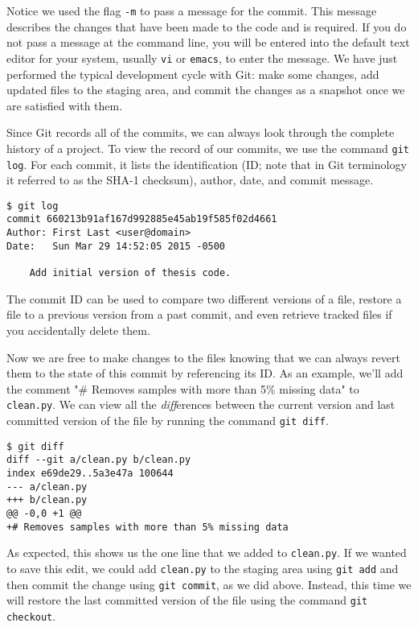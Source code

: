 Notice we used the flag \verb|-m| to pass a message for the commit.
This message describes the changes that have been made to the code and is required.
If you do not pass a message at the command line, you will be entered into the default text editor for your system, usually \verb|vi| or \verb|emacs|, to enter the message.
We have just performed the typical development cycle with Git:
make some changes, add updated files to the staging area, and commit the changes as a snapshot once we are satisfied with them.

Since Git records all of the commits, we can always look through the complete history of a project.
To view the record of our commits, we use the command \verb|git log|.
For each commit, it lists the identification (ID; note that in Git terminology it referred to as the SHA-1 checksum), author, date, and commit message.

\begin{lstlisting}
$ git log
commit 660213b91af167d992885e45ab19f585f02d4661
Author: First Last <user@domain>
Date:   Sun Mar 29 14:52:05 2015 -0500

    Add initial version of thesis code.
\end{lstlisting}

The commit ID can be used to compare two different versions of a file, restore a file to a previous version from a past commit, and even retrieve tracked files if you accidentally delete them.

Now we are free to make changes to the files knowing that we can always revert them to the state of this commit by referencing its ID.
As an example, we'll add the comment "\# Removes samples with more than 5\% missing data" to \verb|clean.py|.
We can view all the \textit{diff}erences between the current version and last committed version of the file by running the command \verb|git diff|.

\begin{lstlisting}
$ git diff
diff --git a/clean.py b/clean.py
index e69de29..5a3e47a 100644
--- a/clean.py
+++ b/clean.py
@@ -0,0 +1 @@
+# Removes samples with more than 5% missing data
\end{lstlisting}

As expected, this shows us the one line that we added to \verb|clean.py|.
If we wanted to save this edit, we could add \verb|clean.py| to the staging area using \verb|git add| and then commit the change using \verb|git commit|, as we did above.
Instead, this time we will restore the last committed version of the file using the command \verb|git checkout|.

